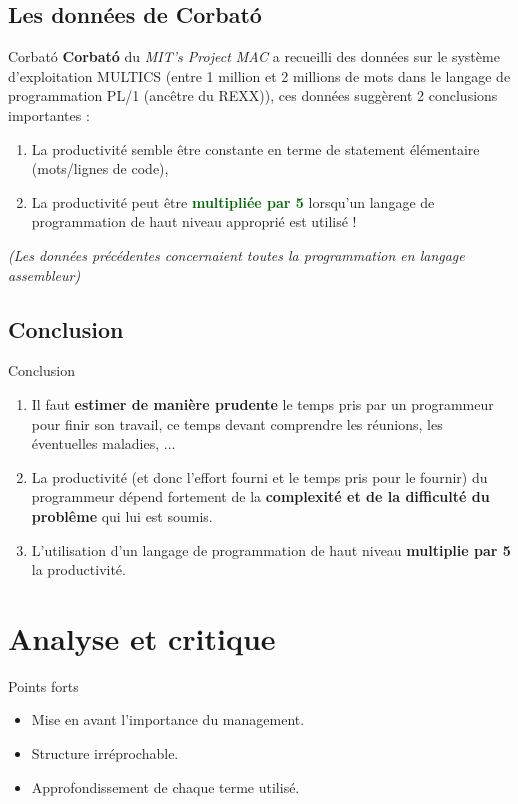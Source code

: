 \documentclass{beamer}
\newcommand{\gre}[1]{\textcolor{darkgreen}{#1}}
\begin{document}
\subsection{Les données de Corbató}

\begin{frame}{Corbató}
\textbf{Corbató} du \textit{MIT's Project MAC} a recueilli des données sur le système d'exploitation MULTICS (entre 1 million et 2 
millions de mots dans le langage de programmation PL/1 (ancêtre du REXX)), ces données suggèrent 2 conclusions importantes :
\begin{enumerate}
\item La productivité semble être constante en terme de statement élémentaire (mots/lignes de code),
\item La productivité peut être \gre{\textbf{multipliée par 5}} lorsqu'un langage de programmation de haut niveau approprié est 
utilisé !
\end{enumerate}
\textit{(Les données précédentes concernaient toutes la programmation en langage assembleur)}
\end{frame}

\subsection*{Conclusion}
\begin{frame}{Conclusion}
\begin{enumerate}
\item Il faut \textbf{estimer de manière prudente} le temps pris par un programmeur pour finir son travail, ce temps devant 
comprendre les réunions, les éventuelles maladies, ...
\pause\item La productivité (et donc l'effort fourni et le temps pris pour le fournir) du programmeur dépend fortement de la 
\textbf{complexité et de la difficulté du problême} qui lui est 
soumis.
\pause\item L'utilisation d'un langage de programmation de haut niveau \textbf{multiplie par 5} la productivité.
\end{enumerate}
\end{frame}

\section{Analyse et critique}

\begin{frame}{Points forts}
\begin{itemize}
\item Mise en avant l'importance du management.
\item Structure irréprochable.
\item Approfondissement de chaque terme utilisé.
\end{itemize}
\end{frame}
\end{document}

